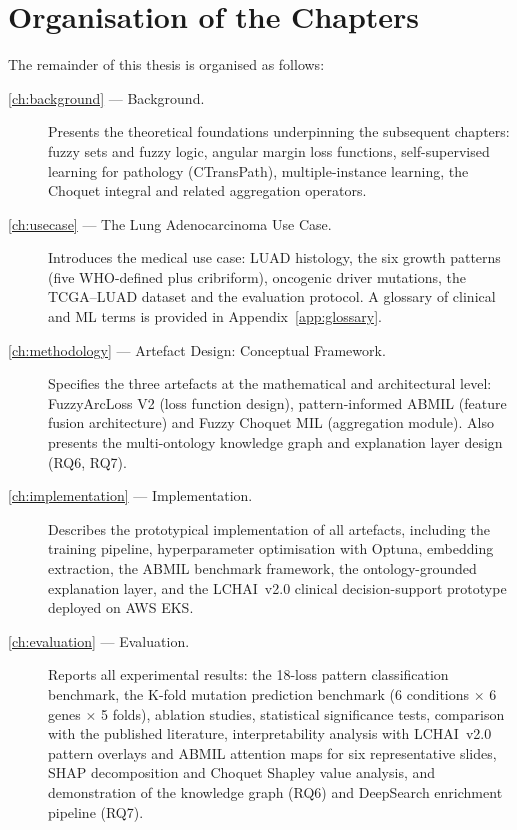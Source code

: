 

\section{Organisation of the Chapters}
\label{sec:intro:outline}

The remainder of this thesis is organised as follows:

\begin{description}
    \item[\cref{ch:background} --- Background.]  Presents the theoretical foundations underpinning the subsequent chapters: fuzzy sets and fuzzy logic, angular margin loss functions, self-supervised learning for pathology (CTransPath), multiple-instance learning, the Choquet integral and related aggregation operators.

    \item[\cref{ch:usecase} --- The Lung Adenocarcinoma Use Case.]  Introduces the medical use case: LUAD histology, the six growth patterns (five WHO-defined plus cribriform), oncogenic driver mutations, the TCGA--LUAD dataset and the evaluation protocol.  A glossary of clinical and ML terms is provided in Appendix~\ref{app:glossary}.

    \item[\cref{ch:methodology} --- Artefact Design: Conceptual Framework.]  Specifies the three artefacts at the mathematical and architectural level: FuzzyArcLoss V2 (loss function design), pattern-informed ABMIL (feature fusion architecture) and Fuzzy Choquet MIL (aggregation module).  Also presents the multi-ontology knowledge graph and explanation layer design (RQ6, RQ7).

    \item[\cref{ch:implementation} --- Implementation.]  Describes the prototypical implementation of all artefacts, including the training pipeline, hyperparameter optimisation with Optuna, embedding extraction, the ABMIL benchmark framework, the ontology-grounded explanation layer, and the LCHAI~v2.0 clinical decision-support prototype deployed on AWS EKS.

    \item[\cref{ch:evaluation} --- Evaluation.]  Reports all experimental results: the 18-loss pattern classification benchmark, the K-fold mutation prediction benchmark (6 conditions $\times$ 6 genes $\times$ 5 folds), ablation studies, statistical significance tests, comparison with the published literature, interpretability analysis with LCHAI~v2.0 pattern overlays and ABMIL attention maps for six representative slides, SHAP decomposition and Choquet Shapley value analysis, and demonstration of the knowledge graph (RQ6) and DeepSearch enrichment pipeline (RQ7).


\end{description}
